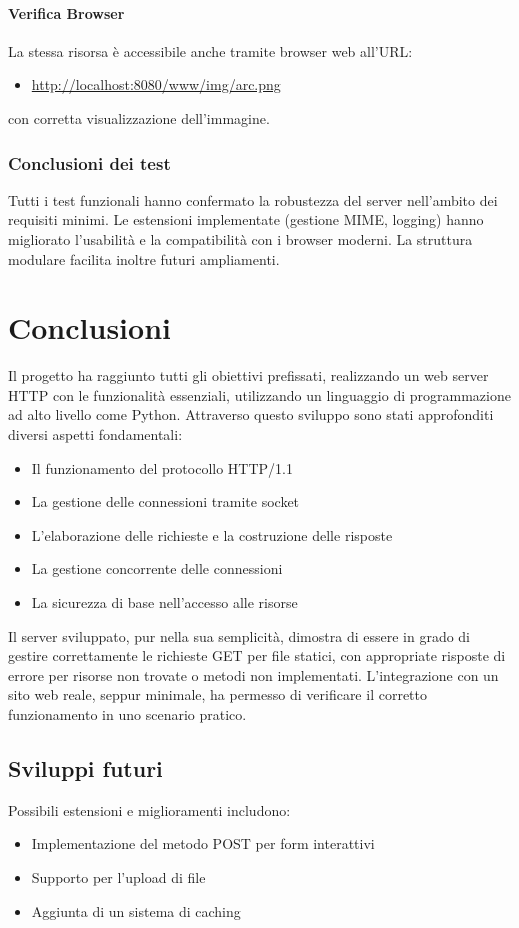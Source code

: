 \documentclass[a4paper,12pt]{report}
\begin{document}
\subsubsection{Verifica Browser}
La stessa risorsa è accessibile anche tramite browser web all'URL:
\begin{itemize}
    \item \url{http://localhost:8080/www/img/arc.png}
\end{itemize}
con corretta visualizzazione dell'immagine.


\subsection{Conclusioni dei test}
Tutti i test funzionali hanno confermato la robustezza del server nell'ambito dei requisiti minimi. Le estensioni implementate (gestione MIME, logging)
hanno migliorato l'usabilità e la compatibilità con i browser moderni. La struttura modulare facilita inoltre futuri ampliamenti.


\chapter{Conclusioni}
Il progetto ha raggiunto tutti gli obiettivi prefissati, realizzando un web server HTTP con le funzionalità essenziali, utilizzando un
linguaggio di programmazione ad alto livello come Python. Attraverso questo sviluppo sono stati approfonditi diversi aspetti fondamentali:
\begin{itemize}
    \item Il funzionamento del protocollo HTTP/1.1
    \item La gestione delle connessioni tramite socket
    \item L'elaborazione delle richieste e la costruzione delle risposte
    \item La gestione concorrente delle connessioni
    \item La sicurezza di base nell'accesso alle risorse
\end{itemize}

Il server sviluppato, pur nella sua semplicità, dimostra di essere in grado di gestire correttamente le richieste GET per file statici, con
appropriate risposte di errore per risorse non trovate o metodi non implementati. L'integrazione con un sito web reale, seppur minimale, ha permesso di
verificare il corretto funzionamento in uno scenario pratico.

\section{Sviluppi futuri}
Possibili estensioni e miglioramenti includono:
\begin{itemize}
    \item Implementazione del metodo POST per form interattivi
    \item Supporto per l'upload di file
    \item Aggiunta di un sistema di caching
\end{itemize}
\end{document}
